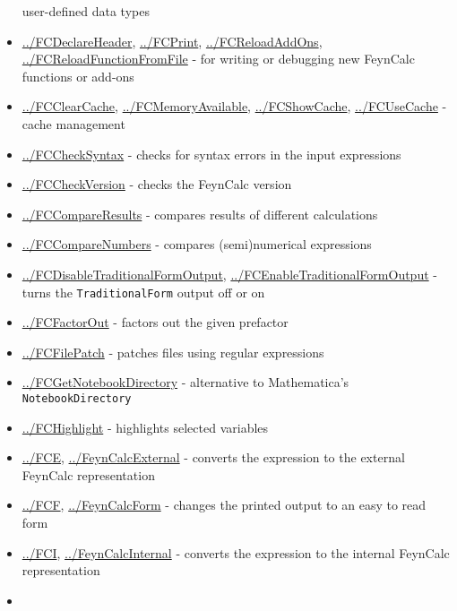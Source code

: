 \documentclass[../FeynCalcManual.tex]{subfiles}
\begin{document}
\begin{itemize}
  user-defined data types
\item
  \hyperlink{../fcdeclareheader}{../FCDeclareHeader},
  \hyperlink{../fcprint}{../FCPrint},
  \hyperlink{../fcreloadaddons}{../FCReloadAddOns},
  \hyperlink{../fcreloadfunctionfromfile}{../FCReloadFunctionFromFile} -
  for writing or debugging new FeynCalc functions or add-ons
\item
  \hyperlink{../fcclearcache}{../FCClearCache},
  \hyperlink{../fcmemoryavailable}{../FCMemoryAvailable},
  \hyperlink{../fcshowcache}{../FCShowCache},
  \hyperlink{../fcusecache}{../FCUseCache} - cache management
\item
  \hyperlink{../fcchecksyntax}{../FCCheckSyntax} - checks for syntax
  errors in the input expressions
\item
  \hyperlink{../fccheckversion}{../FCCheckVersion} - checks the FeynCalc
  version
\item
  \hyperlink{../fccompareresults}{../FCCompareResults} - compares
  results of different calculations
\item
  \hyperlink{../fccomparenumbers}{../FCCompareNumbers} - compares
  (semi)numerical expressions
\item
  \hyperlink{../fcdisabletraditionalformoutput}{../FCDisableTraditionalFormOutput},
  \hyperlink{../fcenabletraditionalformoutput}{../FCEnableTraditionalFormOutput}
  - turns the \texttt{TraditionalForm} output off or on
\item
  \hyperlink{../fcfactorout}{../FCFactorOut} - factors out the given
  prefactor
\item
  \hyperlink{../fcfilepatch}{../FCFilePatch} - patches files using
  regular expressions
\item
  \hyperlink{../fcgetnotebookdirectory}{../FCGetNotebookDirectory} -
  alternative to Mathematica's \texttt{NotebookDirectory}
\item
  \hyperlink{../fchighlight}{../FCHighlight} - highlights selected
  variables
\item
  \hyperlink{../fce}{../FCE},
  \hyperlink{../feyncalcexternal}{../FeynCalcExternal} - converts the
  expression to the external FeynCalc representation
\item
  \hyperlink{../fcf}{../FCF},
  \hyperlink{../feyncalcform}{../FeynCalcForm} - changes the printed
  output to an easy to read form
\item
  \hyperlink{../fci}{../FCI},
  \hyperlink{../feyncalcinternal}{../FeynCalcInternal} - converts the
  expression to the internal FeynCalc representation
\item

\end{itemize}
\end{document}
